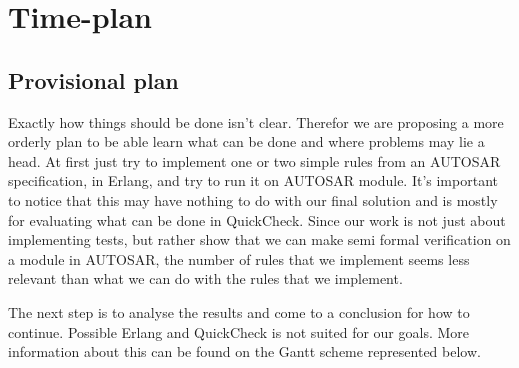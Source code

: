 \documentclass[11pt,a4paper]{report}
\begin{document}
\chapter{Time-plan}
\section{Provisional plan}
Exactly how things should be done isn't clear. Therefor we are proposing a more
orderly plan to be able learn what can be done and where problems may lie a
head. At first just try to implement one or two simple rules from an AUTOSAR
specification, in Erlang, and try to run it on AUTOSAR module. It's important to
notice that this may have nothing to do with our final solution and is mostly
for evaluating what can be done in QuickCheck. Since our work is not just about
implementing tests, but rather show that we can make semi formal verification on
a module in AUTOSAR, the number of rules that we implement seems less relevant
than what we can do with the rules that we implement.

The next step is to analyse the results and come to a conclusion for how to
continue. Possible Erlang and QuickCheck is not suited for our goals.
More information about this can be found on the Gantt scheme
represented below.
\end{document}
